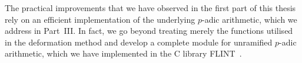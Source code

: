 The practical improvements that we have observed in the first part of 
this thesis rely on an efficient implementation of the underlying 
$p$-adic arithmetic, which we address in Part~{III}.  In fact, we 
go beyond treating merely the functions utilised in the deformation 
method and develop a complete module for unramified $p$-adic arithmetic, 
which we have implemented in the C library {\sc FLINT}~\citep{FLINT}.

